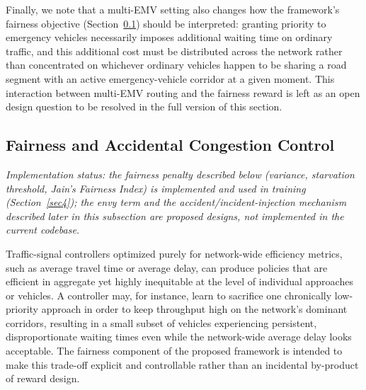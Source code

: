\documentclass[3p,times]{elsarticle}
\theoremstyle{plain}
\theoremstyle{definition}
\begin{document}
Finally, we note that a multi-EMV setting also changes how the
framework's fairness objective (Section~\ref{subsec3-3}) should be
interpreted: granting priority to emergency vehicles necessarily
imposes additional waiting time on ordinary traffic, and this
additional cost must be distributed across the network rather than
concentrated on whichever ordinary vehicles happen to be sharing a
road segment with an active emergency-vehicle corridor at a given
moment. This interaction between multi-EMV routing and the fairness
reward is left as an open design question to be resolved in the full
version of this section.


\subsection{Fairness and Accidental Congestion Control}\label{subsec3-3}

\textit{Implementation status: the fairness penalty described below
(variance, starvation threshold, Jain's Fairness Index) is implemented
and used in training (Section~\ref{sec4}); the envy term and the
accident/incident-injection mechanism described later in this
subsection are proposed designs, not implemented in the current
codebase.}

Traffic-signal controllers optimized purely for network-wide
efficiency metrics, such as average travel time or average delay, can
produce policies that are efficient in aggregate yet highly inequitable
at the level of individual approaches or vehicles. A controller may,
for instance, learn to sacrifice one chronically low-priority approach
in order to keep throughput high on the network's dominant corridors,
resulting in a small subset of vehicles experiencing persistent,
disproportionate waiting times even while the network-wide average
delay looks acceptable. The fairness component of the proposed
framework is intended to make this trade-off explicit and controllable
rather than an incidental by-product of reward design.
\end{document}
